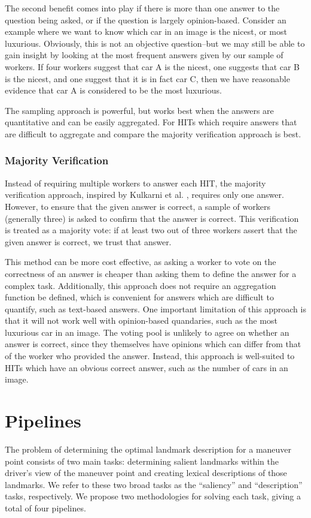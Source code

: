 The second benefit comes into play if there is more than one answer to the question being asked, or if the question is largely opinion-based. Consider an example where we want to know which car in an image is the nicest, or most luxurious. Obviously, this is not an objective question--but we may still be able to gain insight by looking at the most frequent answers given by our sample of workers. If four workers suggest that car A is the nicest, one suggests that car B is the nicest, and one suggest that it is in fact car C, then we have reasonable evidence that car A is considered to be the most luxurious.

The sampling approach is powerful, but works best when the answers are quantitative and can be easily aggregated. For HITs which require answers that are difficult to aggregate and compare the majority verification approach is best.

\subsubsection{Majority Verification}

Instead of requiring multiple workers to answer each HIT, the majority verification approach, inspired by Kulkarni et al. \cite{kulkarni2011turkomatic}, requires only one answer. However, to ensure that the given answer is correct, a sample of workers (generally three) is asked to confirm that the answer is correct. This verification is treated as a majority vote: if at least two out of three workers assert that the given answer is correct, we trust that answer. 

This method can be more cost effective, as asking a worker to vote on the correctness of an answer is cheaper than asking them to define the answer for a complex task. Additionally, this approach does not require an aggregation function be defined, which is convenient for answers which are difficult to quantify, such as text-based answers. One important limitation of this approach is that it will not work well with opinion-based quandaries, such as the most luxurious car in an image. The voting pool is unlikely to agree on whether an answer is correct, since they themselves have opinions which can differ from that of the worker who provided the answer. Instead, this approach is well-suited to HITs which have an obvious correct answer, such as the number of cars in an image.

\section{Pipelines}
The problem of determining the optimal landmark description for a maneuver point consists of two main tasks: determining salient landmarks within the driver’s view of the maneuver point and creating lexical descriptions of those landmarks. We refer to these two broad tasks as the “saliency” and “description” tasks, respectively. We propose two methodologies for solving each task, giving a total of four pipelines. 

